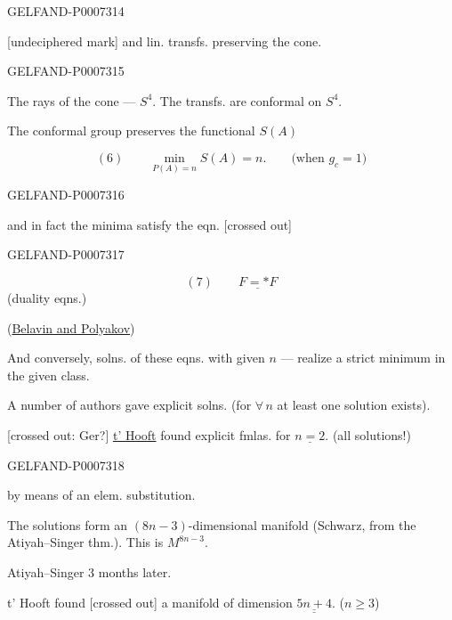 \begin{GelfandAdjacentEvidence}{GELFAND-P000731}{4}

[undeciphered mark] and lin. transfs. preserving the cone.
\end{GelfandAdjacentEvidence}
\begin{GelfandAdjacentEvidence}{GELFAND-P000731}{5}


The rays of the cone --- \(S^4\). The transfs. are conformal on \(S^4\).

The conformal group preserves the functional \(S(A)\)

\[
(6)\qquad \min_{P(A)=n}S(A)=n.\qquad \text{(when }g_c=1\text{)}
\]
\end{GelfandAdjacentEvidence}
\begin{GelfandAdjacentEvidence}{GELFAND-P000731}{6}


and in fact the minima satisfy the eqn. [crossed out]
\end{GelfandAdjacentEvidence}
\begin{GelfandAdjacentEvidence}{GELFAND-P000731}{7}

\[
(7)\qquad \underline{F={*}F}
\]
(duality eqns.)

(\href{https://doi.org/10.1016/0370-2693(75)90163-X}{Belavin and Polyakov})

And conversely, solns. of these eqns. with given \(n\) --- realize a strict minimum in the given class.

A number of authors gave explicit solns. (for \(\forall\,n\) at least one solution exists).

[crossed out: Ger?] \underline{t' Hooft} found explicit fmlas. for \(\underline{n=2}\). (all solutions!)
\end{GelfandAdjacentEvidence}
\begin{GelfandAdjacentEvidence}{GELFAND-P000731}{8}


by means of an elem. substitution.

The solutions form an \((8n-3)\)-dimensional manifold
(Schwarz, from the Atiyah--Singer thm.). This is \(M^{8n-3}\).

Atiyah--Singer 3 months later.

t' Hooft found [crossed out] a manifold of dimension \(\underline{\underline{5n+4}}\). (\(n\geq3\))
\end{GelfandAdjacentEvidence}
